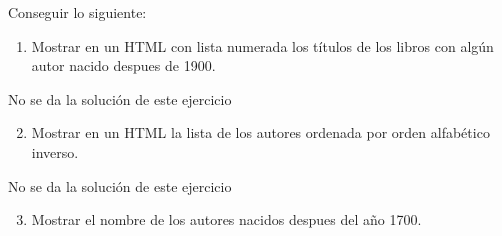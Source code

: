 \documentclass[letterpaper,10pt,spanish]{sphinxmanual}
\begin{document}
Conseguir lo siguiente:
\begin{enumerate}
\item {} 
Mostrar en un HTML con lista numerada los títulos de los libros con algún autor nacido despues de 1900.

\end{enumerate}

\begin{sphinxVerbatim}[commandchars=\\\{\}]
    No se da la solución de este
    ejercicio
\end{sphinxVerbatim}
\begin{enumerate}
\setcounter{enumi}{1}
\item {} 
Mostrar en un HTML la lista de los autores ordenada por orden alfabético inverso.

\end{enumerate}

\begin{sphinxVerbatim}[commandchars=\\\{\}]
    No se da la solución de este
    ejercicio
\end{sphinxVerbatim}
\begin{enumerate}
\setcounter{enumi}{2}
\item {} 
Mostrar el nombre de los autores nacidos despues del año 1700.

\end{enumerate}
\end{document}
